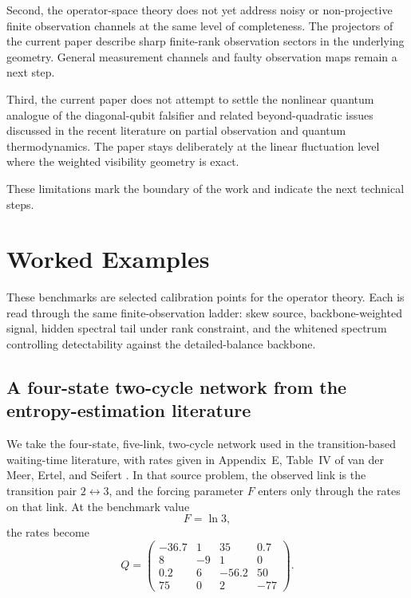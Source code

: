 \documentclass[11pt,a4paper]{article}
\numberwithin{equation}{section}
\theoremstyle{thmcompact}
\theoremstyle{remark}
\begin{document}
Second, the operator-space theory does not yet address noisy or non-projective finite observation channels at the same level of completeness. The projectors of the current paper describe sharp finite-rank observation sectors in the underlying geometry. General measurement channels and faulty observation maps remain a next step.

Third, the current paper does not attempt to settle the nonlinear quantum analogue of the diagonal-qubit falsifier and related beyond-quadratic issues discussed in the recent literature on partial observation and quantum thermodynamics. The paper stays deliberately at the linear fluctuation level where the weighted visibility geometry is exact.

These limitations mark the boundary of the work and indicate the next technical steps.


\section{Worked Examples}
\label{sec:worked-examples}
\label{sec:first_worked_literature_benchmark}

These benchmarks are selected calibration points for the operator theory. Each is read through the same finite-observation ladder: skew source, backbone-weighted signal, hidden spectral tail under rank constraint, and the whitened spectrum controlling detectability against the detailed-balance backbone.

\subsection{A four-state two-cycle network from the entropy-estimation literature}

We take the four-state, five-link, two-cycle network used in the transition-based waiting-time literature, with rates given in Appendix~E, Table~IV of van der Meer, Ertel, and Seifert \cite{vanDerMeerErtelSeifert2022}. In that source problem, the observed link is the transition pair \(2\leftrightarrow 3\), and the forcing parameter \(F\) enters only through the rates on that link. At the benchmark value
\begin{equation}
F=\ln 3,
\end{equation}
the rates become
\begin{equation}
Q=
\begin{pmatrix}
-36.7 & 1 & 35 & 0.7 \\
8 & -9 & 1 & 0 \\
0.2 & 6 & -56.2 & 50 \\
75 & 0 & 2 & -77
\end{pmatrix}.
\end{equation}
\end{document}
